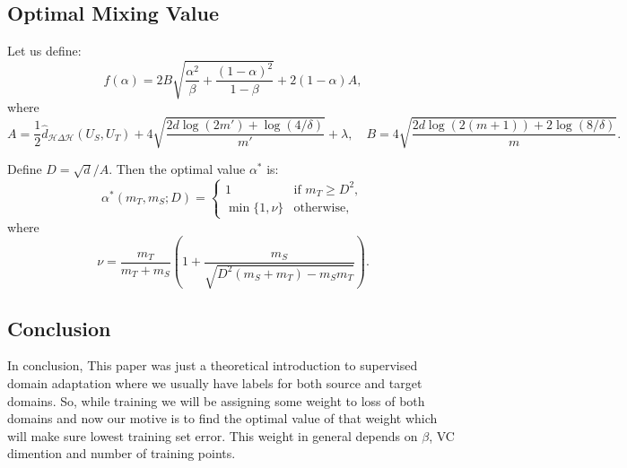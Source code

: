 \documentclass{article}
\begin{document}
\subsection*{Optimal Mixing Value}

Let us define:
\[
f(\alpha) = 2B \sqrt{\frac{\alpha^2}{\beta} + \frac{(1 - \alpha)^2}{1 - \beta}} + 2(1 - \alpha)A,
\]
where
\[
A = \frac{1}{2} \hat{d}_{\mathcal{H} \Delta \mathcal{H}}(U_S, U_T) + 4 \sqrt{\frac{2d \log(2m') + \log(4/\delta)}{m'}} + \lambda,
\quad
B = 4 \sqrt{\frac{2d \log(2(m + 1)) + 2 \log(8/\delta)}{m}}.
\]

Define $D = \sqrt{d}/A$. Then the optimal value $\alpha^*$ is:
\[
\alpha^*(m_T, m_S; D) = 
\begin{cases}
1 & \text{if } m_T \geq D^2, \\
\min\{1, \nu\} & \text{otherwise},
\end{cases}
\]
where
\[
\nu = \frac{m_T}{m_T + m_S} \left(1 + \frac{m_S}{\sqrt{D^2(m_S + m_T) - m_S m_T}}\right).
\]

\subsection*{Conclusion}
In conclusion, This paper was just a theoretical introduction to supervised domain adaptation where we usually have labels for both source and target domains. So, while training we will be assigning some weight to loss of both domains and now our motive is to find the optimal value of that weight which will make sure lowest training set error. This weight in general depends on $\beta$, VC dimention and number of training points.
\end{document}
